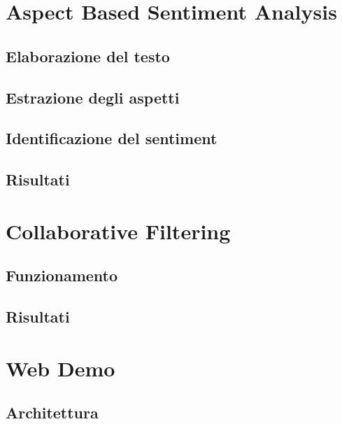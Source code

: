 \documentclass[hidelinks, 12pt]{article}
\begin{document}
\clearpage



\section{Aspect Based Sentiment Analysis}
\label{sec:absa}

\subsection{Elaborazione del testo}

\subsection{Estrazione degli aspetti}

\subsection{Identificazione del sentiment}

\subsection{Risultati}



\clearpage



\section{Collaborative Filtering}

\subsection{Funzionamento}

\subsection{Risultati}



\clearpage



\section{Web Demo}
\label{sec:ui}


\subsection{Architettura}
\end{document}
